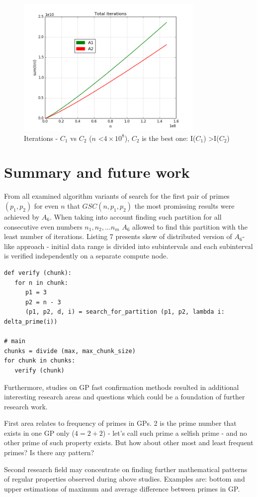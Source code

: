 \documentclass[10pt,twocolumn]{article}
\begin{document}
\begin{figure}[!ht]
\centering
\includegraphics[width=9cm]{f_checkpoint_sym_primes_alg1}
\caption{Iterations - $C_1$ vs $C_2$ ($n$ \textless $4  \times 10^8$), $C_2$ is the best one: I($C_1$) \textgreater I($C_2$)}
\label{fig:sym_primes_alg1}
\end{figure}

\section{Summary and future work}

From all examined algorithm variants of search for the first pair of primes $(p_1, p_2)$ for even $n$ that $GSC(n, p_1, p_2)$ the most promissing results were achieved by $A_6$. When taking into account finding such partition for all consecutive even numbers $n_1, n_2, \ldots n_m$ $A_6$ allowed to find this partition with the least number of iterations. Listing 7 presents skew of distributed version of $A_6$-like approach - initial data range is divided into subintervals and each subinterval is verified independently on a separate compute node. \par

\lstset{language=Python}
\lstset{breaklines=true}
\lstset{frame=shadowbox}
\begin{lstlisting}[linewidth=8.5cm]
def verify (chunk):
   for n in chunk:
      p1 = 3
      p2 = n - 3
      (p1, p2, d, i) = search_for_partition (p1, p2, lambda i: delta_prime(i))

# main
chunks = divide (max, max_chunk_size)
for chunk in chunks:
   verify (chunk)

\end{lstlisting}

Furthermore, studies on GP fast confirmation methods resulted in additional interesting research areas and questions which could be a foundation of further research work. \par
First area relates to frequency of primes in GPs. 2 is the prime number that exists in one GP only ($4 = 2 + 2$) - let's call such prime a selfish prime - and no other prime of such property exists. But how about other most and least frequent primes? Is there any pattern? \par
Second research field may concentrate on finding further mathematical patterns of regular properties observed during above studies. Examples are: bottom and upper estimations of maximum and average difference between primes in GP. 
\end{document}
